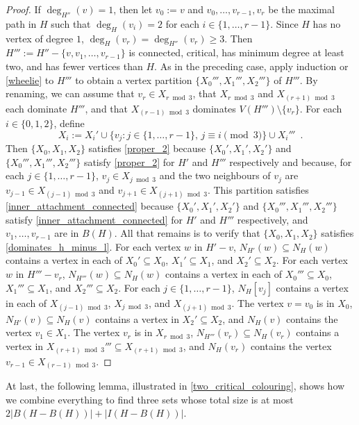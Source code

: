 \documentclass{patmorin}
\begin{document}
\begin{proof}
  If $\deg_{H''}(v)=1$, then let $v_0:=v$ and $v_0,\ldots,v_{r-1},v_r$ be the maximal path in $H$ such that $\deg_H(v_i)=2$ for each $i\in\{1,\ldots,r-1\}$.  Since $H$ has no vertex of degree $1$, $\deg_H(v_r)=\deg_{H''}(v_r)\ge 3$.  Then $H''':=H''-\{v,v_1,\ldots,v_{r-1}\}$ is connected, critical, has minimum degree at least two, and has fewer vertices than $H$.  As in the preceding case, apply induction or \cref{wheelie} to $H'''$ to obtain a vertex partition $\{X_0''',X_1''',X_2'''\}$ of $H'''$.  By renaming, we can assume that $v_r\in X_{r\bmod 3}$, that $X_{r\bmod 3}$ and $X_{(r+1)\bmod 3}$ each dominate $H'''$, and that $X_{(r-1)  \bmod 3}$ dominates $V(H''')\setminus\{v_r\}$.  For each $i\in\{0,1,2\}$, define
  \[
      X_i := X_i' \cup \{ v_j:j\in\{1,\ldots,r-1\},\, j\equiv i\pmod 3\} \cup X_i''' \enspace .  
  \]
  Then $\{X_0,X_1,X_2\}$ satisfies \ref{proper_2} because $\{X_0',X_1',X_2'\}$ and $\{X_0''',X_1''',X_2'''\}$ satisfy \ref{proper_2} for $H'$ and $H'''$ respectively and because, for each $j\in\{1,\ldots,r-1\}$, $v_j\in X_{j\bmod 3}$ and the two neighbours of $v_j$ are $v_{j-1}\in X_{(j-1)\bmod 3}$ and $v_{j+1}\in X_{(j+1)\bmod 3}$.  This partition satisfies \ref{inner_attachment_connected} because $\{X_0',X_1',X_2'\}$ and $\{X_0''',X_1''',X_2'''\}$ satisfy \ref{inner_attachment_connected} for $H'$ and $H'''$ respectively, and $v_1,\ldots,v_{r-1}$ are in $B(H)$.  All that remains is to verify that $\{X_0,X_1,X_2\}$ satisfies \ref{dominates_h_minus_l}. For each vertex $w$ in $H'-v$, $N_{H'}(w)\subseteq N_{H}(w)$ contains a vertex in each of $X_0'\subseteq X_0$, $X_1'\subseteq X_1$, and $X_2'\subseteq X_2$.  For each vertex $w$ in $H'''-v_r$, $N_{H'''}(w)\subseteq N_{H}(w)$ contains a vertex in each of $X_0'''\subseteq X_0$, $X_1'''\subseteq X_1$, and $X_2'''\subseteq X_2$. 
  For each $j\in\{1,\ldots,r-1\}$, $N_H[v_j]$ contains a vertex in each of $X_{(j-1)\bmod 3}$, $X_{j\bmod 3}$, and $X_{(j+1)\bmod 3}$. The vertex $v=v_0$ is in $X_0$, $N_{H'}(v)\subseteq N_H(v)$ contains a vertex in $X_2'\subseteq X_2$, and $N_H(v)$ contains the vertex $v_1\in X_1$.  The vertex $v_r$ is in $X_{r\bmod 3}$, $N_{H'''}(v_r)\subseteq N_H(v_r)$ contains a vertex in $X_{(r+1)\bmod 3}'''\subseteq X_{(r+1)\bmod 3}$, and $N_H(v_r)$ contains the vertex $v_{r-1}\in X_{(r-1)\bmod 3}$.
\end{proof}


At last, the following lemma, illustrated in \cref{two_critical_colouring}, shows how we combine everything to find three sets whose total size is at most $2|B(H-B(H))| + |I(H-B(H))|$.
\end{document}
